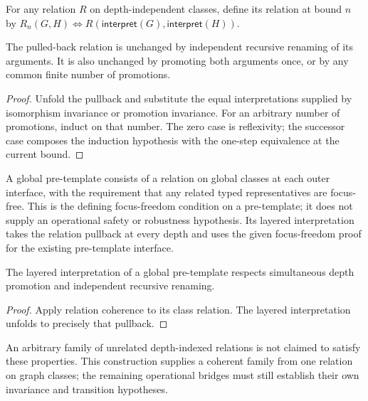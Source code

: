 \begin{definition}
For any relation $R$ on depth-independent classes, define its relation at bound
$n$ by $R_n(G,H)\iff R(\mathsf{interpret}(G),\mathsf{interpret}(H))$.
\end{definition}

\begin{proposition}
The pulled-back relation is unchanged by independent recursive renaming of
its arguments. It is also unchanged by promoting both arguments once, or by
any common finite number of promotions.
\end{proposition}
\begin{proof}
Unfold the pullback and substitute the equal interpretations supplied by
isomorphism invariance or promotion invariance. For an arbitrary number of
promotions, induct on that number. The zero case is reflexivity; the successor
case composes the induction hypothesis with the one-step equivalence at the
current bound.
\end{proof}



\begin{definition}
A global pre-template consists of a relation on global classes at each outer
interface, with the requirement that any related typed representatives are
focus-free. This is the defining focus-freedom condition on a pre-template;
it does not supply an operational safety or robustness hypothesis.
Its layered interpretation takes the relation pullback at every depth and
uses the given focus-freedom proof for the existing pre-template interface.
\end{definition}


\begin{proposition}
The layered interpretation of a global pre-template respects simultaneous
depth promotion and independent recursive renaming.
\end{proposition}
\begin{proof}
Apply relation coherence to its class relation. The layered interpretation
unfolds to precisely that pullback.
\end{proof}
An arbitrary family of unrelated depth-indexed relations is not claimed to
satisfy these properties. This construction supplies a coherent family from
one relation on graph classes; the remaining operational bridges must still
establish their own invariance and transition hypotheses.

